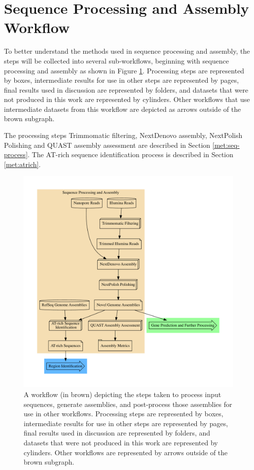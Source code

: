 \section{Sequence Processing and Assembly Workflow}
\label{met:seq-workflow}

To better understand the methods used in sequence processing and
assembly, the steps will be collected into several sub-workflows,
beginning with sequence processing and assembly as shown in Figure
\ref{fig:seq-workflow}. Processing steps are represented by boxes,
intermediate results for use in other steps are represented by pages,
final results used in discussion are represented by folders, and
datasets that were not produced in this work are represented by
cylinders. Other workflows that use intermediate datasets from this
workflow are depicted as arrows outside of the brown subgraph.

The processing steps Trimmomatic filtering, NextDenovo assembly,
NextPolish Polishing and QUAST assembly assessment are described in
Section \ref{met:seq-process}. The AT-rich sequence identification
process is described in Section \ref{met:atrich}.

\begin{figure}
  \centering
  \includegraphics[width=\textwidth]{figures/assembly-met.pdf}
  \caption{A workflow (in brown) depicting the steps taken to process
    input sequences, generate assemblies, and post-process those
    assemblies for use in other workflows. Processing steps are
    represented by boxes, intermediate results for use in other steps
    are represented by pages, final results used in discussion are
    represented by folders, and datasets that were not produced in
    this work are represented by cylinders. Other workflows are
    represented by arrows outside of the brown subgraph.}
  \label{fig:seq-workflow}
\end{figure}

